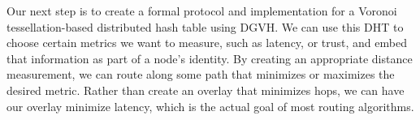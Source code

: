 Our next step is to create a formal protocol and implementation for a Voronoi tessellation-based distributed hash table using DGVH.  
We can use this DHT to choose certain metrics we want to measure, such as latency, or trust, and embed that information as part of a node's identity.
By creating an appropriate distance measurement, we can route along some path that minimizes or maximizes the desired metric.
Rather than create an overlay that minimizes hops, we can have our overlay minimize latency, which is the actual goal of most routing algorithms.


